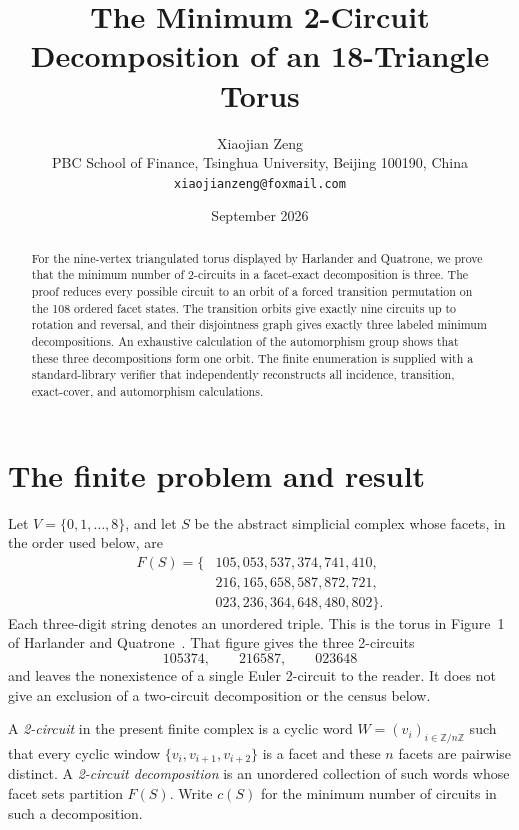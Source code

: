 \documentclass[11pt]{article}
\title{The Minimum 2-Circuit Decomposition of an
18-Triangle Torus}
\author{Xiaojian Zeng\\
PBC School of Finance, Tsinghua University, Beijing 100190, China\\
\texttt{xiaojianzeng@foxmail.com}}
\date{September 2026}
\begin{document}
\maketitle

\begin{abstract}
For the nine-vertex triangulated torus displayed by Harlander and
Quatrone, we prove that the minimum number of 2-circuits in a facet-exact
decomposition is three.  The proof reduces every possible circuit to an orbit
of a forced transition permutation on the 108 ordered facet states.  The
transition orbits give exactly nine circuits up to rotation and reversal, and
their disjointness graph gives exactly three labeled minimum decompositions.
An exhaustive calculation of the automorphism group shows that these three
decompositions form one orbit.  The finite enumeration is supplied with a
standard-library verifier that independently reconstructs all incidence,
transition, exact-cover, and automorphism calculations.
\end{abstract}

\section{The finite problem and result}

Let $V=\{0,1,\ldots,8\}$, and let $S$ be the abstract simplicial complex
whose facets, in the order used below, are
\begin{equation}\label{eq:facets}
\begin{split}
F(S)=\{&105,053,537,374,741,410,\\
       &216,165,658,587,872,721,\\
       &023,236,364,648,480,802\}.
\end{split}
\end{equation}
Each three-digit string denotes an unordered triple.  This is the torus in
Figure~1 of Harlander and Quatrone~\cite{HarlanderQuatrone2026}.  That figure
gives the three 2-circuits
\begin{equation}\label{eq:source-cover}
105374,\qquad 216587,\qquad 023648
\end{equation}
and leaves the nonexistence of a single Euler 2-circuit to the reader.  It does
not give an exclusion of a two-circuit decomposition or the census below.

A \emph{2-circuit} in the present finite complex is a cyclic word
$W=(v_i)_{i\in\mathbb Z/n\mathbb Z}$ such that every cyclic window
$\{v_i,v_{i+1},v_{i+2}\}$ is a facet and these $n$ facets are pairwise
distinct.  A \emph{2-circuit decomposition} is an unordered collection of
such words whose facet sets partition $F(S)$.  Write $c(S)$ for the minimum
number of circuits in such a decomposition.
\end{document}
